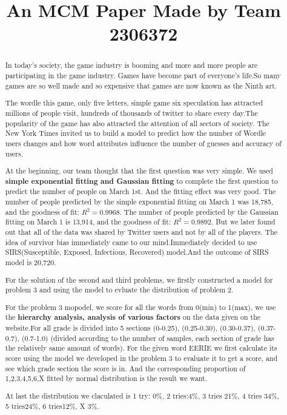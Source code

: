 \documentclass[12pt]{article}  %
\title{An MCM Paper Made by Team 2306372}  %
\begin{document}
\begin{abstract}
In today's society, the game industry is booming and more and more people are participating in the game industry. Games have become part of everyone's life.So many games are so well made and so expensive that games are now known as the Ninth art.

The wordle this game, only five letters, simple game six speculation has attracted millions of people visit, hundreds of thousands of twitter to share every day.The popularity of the game has also attracted the attention of all sectors of society. The New York Times invited us to build a model to predict how the number of Wordle users changes and how word attributes influence the number of guesses and accuracy of users.

At the beginning, our team thought that the first question was very simple. We used \textbf{simple exponential fitting and Gaussian fitting} to complete the first question to predict the number of people on March 1st. And the fitting effect was very good. The number of people predicted by the simple exponential fitting on March 1 was 18,785, and the goodness of fit:
$R^2 = 0.9968$. 
The number of people predicted by the Gaussian fitting on March 1 is 13,914, and the goodness of fit:
$R^2 = 0.9892$.
But we later found out that all of the data was shared by Twitter users and not by all of the players. The idea of survivor bias immediately came to our  mind.Immediately decided to use SIRS(Susceptible, Exposed, Infectious, Recovered) model.And the outcome of SIRS model is 20,720.


For the solution of the second and third problems, we firstly constructed a model for problem 3 and using the model to evluate the distribution of problem 2.

For the problem 3 mopodel, we score for all the words from 0(min) to 1(max), we use the \textbf{hierarchy analysis, analysis of various factors} on the data given on the website.For all grade is divided into 5 sections (0-0.25), (0.25-0.30), (0.30-0.37), (0.37-0.7), (0.7-1.0) (divided according to the number of samples, each section of grade has the relatively same amount of words). For the given word EERIE we first calculate its score using the model we developed in the problem 3 to evaluate it to get a score, and see which grade section the score is in. And the corresponding proportion of 1,2,3,4,5,6,X fitted by normal distribution is the result we want.

At last the distribution we claculated is 1 try: 0\%, 2 tries:4\%, 3 tries 21\%, 4 tries 34\%, 5 tries24\%, 6 tries12\%, X 3\%.



\end{abstract}
\end{document}
